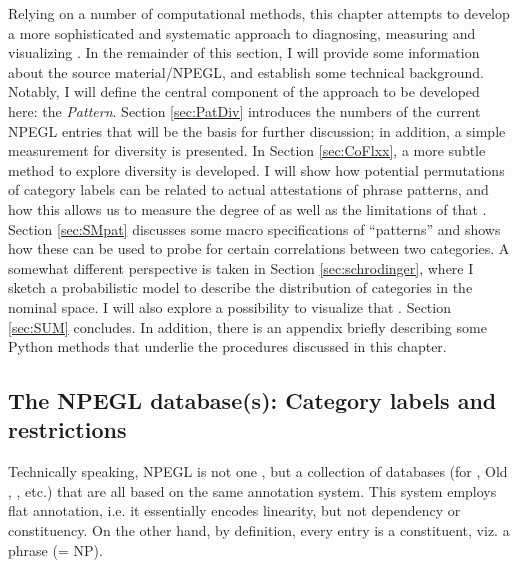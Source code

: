 \documentclass[output=paper,colorlinks,citecolor=brown,draft]{langscibook}
\begin{document}
Relying on a number of computational methods, this chapter attempts to develop a more sophisticated and systematic approach to diagnosing, measuring and visualizing  .  
In the remainder of this section, I will provide some information about the source material/NPEGL, and establish some technical background. Notably, I will define the central component of the approach to be developed here: the \textit{Pattern}.  
Section \ref{sec:PatDiv} introduces the numbers of the current NPEGL entries that will be the basis for further discussion; in addition, a simple measurement for diversity is presented. In Section \ref{sec:CoFlxx},  a more subtle method to explore diversity is developed. I will show how potential permutations of category labels can be related to actual attestations of  phrase patterns, and how this allows us to measure the degree of  as well as the limitations of that . Section \ref{sec:SMpat} discusses some macro specifications of ``patterns'' and shows how these can be used to probe for certain correlations between two categories. A somewhat different perspective is taken in Section \ref{sec:schrodinger}, where I sketch a probabilistic model to describe the distribution of categories in the nominal space. I will also explore a possibility to visualize that . Section \ref{sec:SUM} concludes. In addition, there is an appendix briefly describing some Python methods that underlie the procedures discussed in this chapter. 

\subsection{The NPEGL database(s): Category labels and restrictions}
\label{sec:npegl}

Technically speaking, NPEGL is not one , but a collection of databases (for , Old , , etc.) that are all based on the same annotation system. This system employs flat annotation, i.e. it essentially encodes linearity, but not dependency or constituency. On the other hand, by definition, every  entry is a constituent, viz. a  phrase (= NP).  
\end{document}
